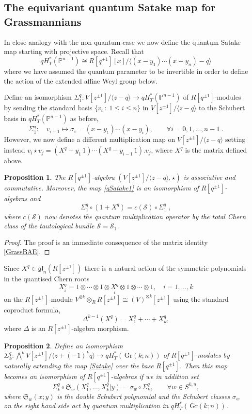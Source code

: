 \documentclass[12pt]{amsart}
\newcommand{\cS}{\mathcal{S}}
\newcommand{\Gr}{\,\mathrm{Gr}}
\newcommand{\fS}{\mathfrak{S}}
\newcommand{\mb}[1]{\mathbb{#1}}
\newcommand{\mc}[1]{\mathcal{#1}}
\newcommand{\ring}{R}
\newtheorem{prop}{Proposition}[section]
\numberwithin{equation}{section}
\numberwithin{figure}{section}
\newcommand{\gl}{\mathfrak{gl}}
\begin{document}
\subsection{The equivariant quantum Satake map for Grassmannians}
In close analogy with the non-quantum case we now define the quantum Satake map starting with projective space. Recall that
\[
qH^*_T(\mb{P}^{n-1})\cong\ring[q^{\pm 1}][x]/\langle(x-y_1)\cdots(x-y_n)-q\rangle
\]
where we have assumed the quantum parameter to be invertible in order to define the action of the extended affine Weyl group below.

Define an isomorphism $\Sigma^q_1:V[z^{\pm 1}]/\langle z-q\rangle\to qH^*_T(\mb{P}^{n-1})$ of $\ring[q^{\pm1}]$-modules by sending the standard basis $\{v_i~:~1\le i\le n\}$ in $V[z^{\pm 1}]/\langle z-q\rangle$ to the Schubert basis in $qH^*_T(\mb{P}^{n-1})$ as before,
\begin{equation}\label{qSatake1}
\Sigma^q_1:\quad v_{i + 1}\mapsto \sigma_{i}=(x-y_1)\cdots(x-y_i),\qquad \forall i=0,1,\ldots,n-1\;.
\end{equation}
However, we now define a different multiplication map on $V[z^{\pm 1}]/\langle z-q\rangle$ setting instead $v_i\star v_j=(X^q-y_1\,1)\cdots(X^q-y_{i - 1}\,1).v_j$, where $X^q$ is the matrix defined above.
\begin{prop}
    The $\ring[q^{\pm 1}]$-algebra $(V[z^{\pm 1}]/\langle z-q\rangle,\star)$ is associative and commutative. Moreover, the map \eqref{qSatake1} is an isomorphism of $\ring[q^{\pm1}]$-algebras and 
    \[
    \Sigma^q_1\circ(1+X^q)=c(\mc{S})\circ\Sigma^q_1\;,
    \]
    where $c(\mc{S})$ now denotes the {\em quantum} multiplication operator by the total Chern class of the tautological bundle $\cS=\cS_1$.
\end{prop}
\begin{proof}
    The proof is an immediate consequence of the matrix identity \eqref{GrassBAE}.
\end{proof}
Since $X^q\in\gl_n(\ring[z^{\pm1}])$ there is a natural action of the symmetric polynomials in the quantised Chern roots
\[
X_i^q=1\otimes\cdots\otimes1\otimes\underset{i}{X^q}\otimes1\otimes\cdots\otimes1,\quad i=1,\ldots,k
\]
on the $\ring[z^{\pm1}]$-module $V^{\otimes k}\otimes_\ring\ring[z^{\pm1}]\cong (V)^{\otimes k}[z^{\pm 1}]$ using the standard coproduct formula,
\[
\Delta^{k-1}(X^q)=X_1^q+\cdots +X^q_k,
\]
where $\Delta$ is an $R[z^{\pm1}]$-algebra morphism.
\begin{prop}\label{prop:quantumSatake}
    Define an isomorphism $\Sigma^q_k:\bigwedge^kV[z^{\pm1}]/\langle z+(-1)^kq\rangle\to qH^*_T(\Gr(k;n))$ of $\ring[q^{\pm1}]$-modules by naturally extending the map \eqref{Satake} over the base $\ring[q^{\pm 1}]$.  
    Then this map becomes an isomorphism of $\ring[q^{\pm1}]$-algebras if we in addition set
    \begin{equation}
    \Sigma^q_k\circ \fS_w(X^q_1,\ldots,X^q_k|y)=\sigma_w\circ\Sigma^q_k,\qquad
    \forall w\in S^{k,n},
    \end{equation}
    where $\fS_w(x;y)$ is the double Schubert polynomial and the Schubert classes $\sigma_w$ on the right hand side act by {\em quantum} multiplication in $qH^*_T(\Gr(k;n))$.
\end{prop}
\end{document}
